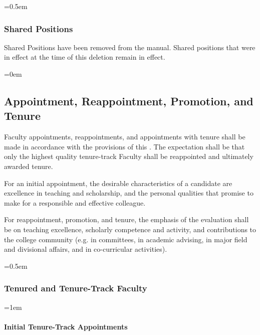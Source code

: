 \documentclass{manual}
\let\oldsubsection\subsection
\renewcommand\subsection{\leftskip=0em\oldsubsection}
\let\oldsubsubsection\subsubsection
\renewcommand\subsubsection{\leftskip=0.5em\oldsubsubsection}
\let\oldparagraph\paragraph
\renewcommand\paragraph{\leftskip=1em\oldparagraph}
\begin{document}
		\subsubsection{Shared Positions}
		Shared Positions have been removed from the manual. Shared positions that were in effect at the time of this deletion remain in effect.

	\subsection{Appointment, Reappointment, Promotion, and Tenure}\label{sec:AppointmentReappointmentPromotionAndTenure}
	Faculty appointments, reappointments, and appointments with tenure shall be made in accordance with the provisions of this . The expectation shall be that only the highest quality tenure-track Faculty shall be reappointed and ultimately awarded tenure.

	For an initial appointment, the desirable characteristics of a candidate are excellence in teaching and scholarship, and the personal qualities that promise to make for a responsible and effective colleague.

	For reappointment, promotion, and tenure, the emphasis of the evaluation shall be on teaching excellence, scholarly competence and activity, and contributions to the college community (e.g. in committees, in academic advising, in major field and divisional affairs, and in co-curricular activities).

		\subsubsection{Tenured and Tenure-Track Faculty}\label{sub:TenuredAndTenureTrackFaculty}

			\paragraph{Initial Tenure-Track Appointments}\label{par:InitialTenureTrackAppointments}
\end{document}
